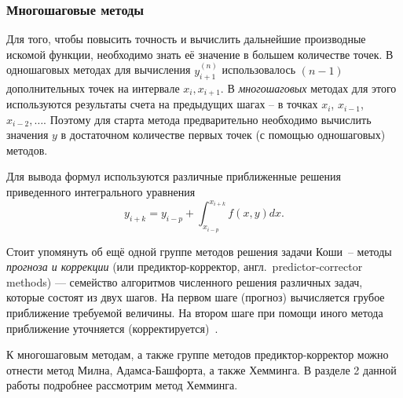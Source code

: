 \subsubsection{Многошаговые методы}

Для того, чтобы повысить точность и вычислить дальнейшие производные искомой
функции, необходимо знать её значение в большем количестве точек. В одношаговых
методах для вычисления $y^{(n)}_{i+1}$ использовалось $(n-1)$ дополнительных точек
на интервале $x_i, x_{i+1}$. В \textit{многошаговых} методах для этого используются
результаты счета на предыдущих шагах -- в точках $x_i$, $x_{i-1}$, $x_{i-2}, \dots$.
Поэтому для старта метода предварительно необходимо вычислить значения $y$ в
достаточном количестве первых точек (с помощью одношаговых) методов.

Для вывода формул используются различные приближенные решения приведенного
интегрального уравнения
$$
  y_{i+k} = y_{i-p} + \int_{x_{i-p}}^{x_{i+k}} f(x,y)dx.
$$

Стоит упомянуть об ещё одной группе методов решения задачи Коши~-- методы
\textit{прогноза и коррекции} (или предиктор-корректор, англ.~predictor-corrector methods) ---
семейство алгоритмов численного решения различных задач, которые состоят
из двух шагов. На первом шаге (прогноз) вычисляется грубое приближение
требуемой величины. На втором шаге при помощи иного метода приближение
уточняется (корректируется)~\cite{approx_intro}.

К многошаговым методам, а также группе методов предиктор-корректор можно отнести
метод Милна, Адамса-Башфорта, а также Хемминга. В разделе 2 данной работы подробнее
рассмотрим метод Хемминга.

\pagebreak
